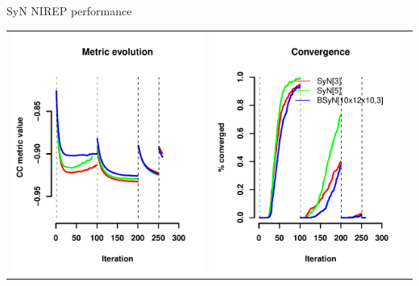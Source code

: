 \documentclass[xcolor=dvipsnames,serif,10pt]{beamer}
\begin{document}

\begin{frame}{SyN NIREP performance}

\begin{center}
\vspace*{-10mm}
\begin{tabular}{cc}
  \hspace{-5mm}
  \includegraphics[width=67mm]{../WBIRStudy/SyNMetricEvolution.pdf} &
  \hspace{-15mm}
  \includegraphics[width=67mm]{../WBIRStudy/SyNConvergences.pdf}
\end{tabular}
\end{center}

\end{frame}


\end{document}
